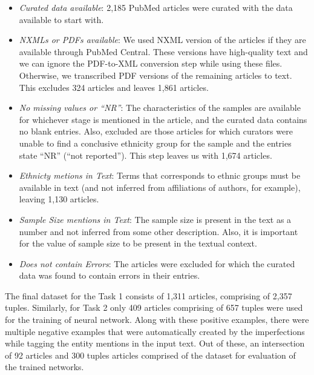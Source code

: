 \begin{itemize}
    \item \emph{Curated data available}:
    2,185 PubMed articles were curated with the data available to start with.
    
    \item \emph{NXMLs or PDFs available}:
    We used NXML version of the articles if they are available through PubMed Central. These versions have high-quality text and we can ignore the PDF-to-XML conversion step while using these files. Otherwise, we transcribed PDF versions of the remaining articles to text. This excludes 324 articles and leaves 1,861 articles.
    
    \item \emph{No missing values or ``NR''}:
    The characteristics of the samples are available for whichever stage is mentioned in the article, and the curated data contains no blank entries. Also, excluded are those articles for which curators were unable to find a conclusive ethnicity group for the sample and the entries state ``NR'' (``not reported''). This step leaves us with 1,674 articles.
    
    \item \emph{Ethnicty metions in Text}:
    Terms that corresponds to ethnic groups must be available in text (and not inferred from affiliations of authors, for example), leaving 1,130 articles.
    
    \item \emph{Sample Size mentions in Text}:
    The sample size is present in the text as a number and not inferred from some other description. Also, it is important for the value of sample size to be present in the textual context. 
    
    \item \emph{Does not contain Errors}:
    The articles were excluded for which the curated data was found to contain errors in their entries.
\end{itemize}

The final dataset for the Task 1 consists of 1,311 articles, comprising of 2,357 {\it <stage, ethnicity>} tuples. Similarly, for Task 2 only 409 articles comprising of 657 {\it <stage, sample size>} tuples were used for the training of neural network. Along with these positive examples, there were multiple negative examples that were automatically created by the imperfections while tagging the entity mentions in the input text. Out of these, an intersection of 92 articles and 300 tuples articles comprised of the dataset for evaluation of the trained networks.


